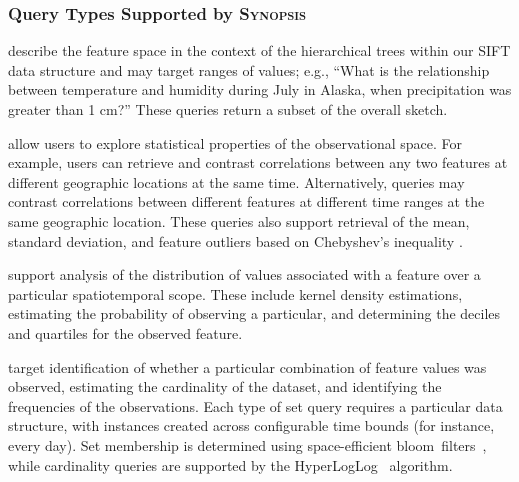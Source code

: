 \subsubsection{Query Types Supported by \textsc{Synopsis}}
\begin{description}[leftmargin=*]
    \item[Relational Queries] describe the feature space in the context of the hierarchical trees within our SIFT data structure and may target ranges of values; e.g., ``What is the relationship between temperature and humidity during July in Alaska, when precipitation was greater than 1 cm?'' These queries return a subset of the overall sketch.

    \item[Statistical Queries] allow users to explore statistical properties of the observational space. For example, users can retrieve and contrast correlations between any two features at different geographic locations at the same time. Alternatively, queries may contrast correlations between different features at different time ranges at the same geographic location. These queries also support retrieval of the mean, standard deviation, and feature outliers based on Chebyshev's inequality \cite{knuth1968art}.

    \item[Density Queries] support analysis of the distribution of values associated with a feature over a particular spatiotemporal scope. These include kernel density estimations, estimating the probability of observing a particular, and determining the deciles and quartiles for the observed feature.%

    \item[Set Queries] target identification of whether a particular combination of feature values was observed, estimating the cardinality of the dataset, and identifying the frequencies of the observations. Each type of set query requires a particular data structure, with instances created across configurable time bounds (for instance, every day). Set membership is determined using space-efficient bloom~filters~\cite{bloom1970space}, while cardinality queries are supported by the HyperLogLog~\cite{flajolet2007hyperloglog} algorithm.


\end{description}
